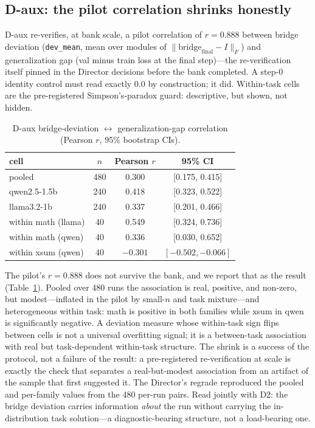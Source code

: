 \documentclass[10pt]{article}
\begin{document}
\subsection{D-aux: the pilot correlation shrinks honestly}
\label{sec:daux}

D-aux re-verifies, at bank scale, a pilot correlation of $r = 0.888$
between bridge deviation (\texttt{dev\_mean}, mean over modules of
$\lVert \mathrm{bridge}_{\mathrm{final}} - I \rVert_F$) and generalization
gap (val minus train loss at the final step)---the re-verification itself
pinned in the Director decisions before the bank completed. A step-0
identity control must read exactly 0.0 by construction; it did.
Within-task cells are the pre-registered Simpson's-paradox guard:
descriptive, but shown, not hidden.

\begin{table}[ht]
\centering
\caption{D-aux bridge-deviation $\leftrightarrow$ generalization-gap
correlation (Pearson $r$, 95\% bootstrap CIs).}
\label{tab:daux}
\small
\begin{tabular}{lccc}
\toprule
cell & $n$ & Pearson $r$ & 95\% CI \\
\midrule
pooled & 480 & 0.300 & [0.175, 0.415] \\
qwen2.5-1.5b & 240 & 0.418 & [0.323, 0.522] \\
llama3.2-1b & 240 & 0.337 & [0.201, 0.466] \\
within math (llama) & 40 & 0.549 & [0.324, 0.736] \\
within math (qwen) & 40 & 0.336 & [0.030, 0.652] \\
within xsum (qwen) & 40 & $-0.301$ & $[-0.502, -0.066]$ \\
\bottomrule
\end{tabular}
\end{table}

The pilot's $r = 0.888$ does not survive the bank, and we report that as
the result (Table~\ref{tab:daux}). Pooled over 480 runs the association is
real, positive, and non-zero, but modest---inflated in the pilot by
small-$n$ and task mixture---and heterogeneous within task: math is
positive in both families while xsum in qwen is significantly negative. A
deviation measure whose within-task sign flips between cells is not a
universal overfitting signal; it is a between-task association with real
but task-dependent within-task structure. The shrink is a success of the
protocol, not a failure of the result: a pre-registered re-verification at
scale is exactly the check that separates a real-but-modest association
from an artifact of the sample that first suggested it. The Director's
regrade reproduced the pooled and per-family values from the 480 per-run
pairs. Read jointly with D2: the bridge deviation carries information
\emph{about} the run without carrying the in-distribution task
solution---a diagnostic-bearing structure, not a load-bearing one.
\end{document}
